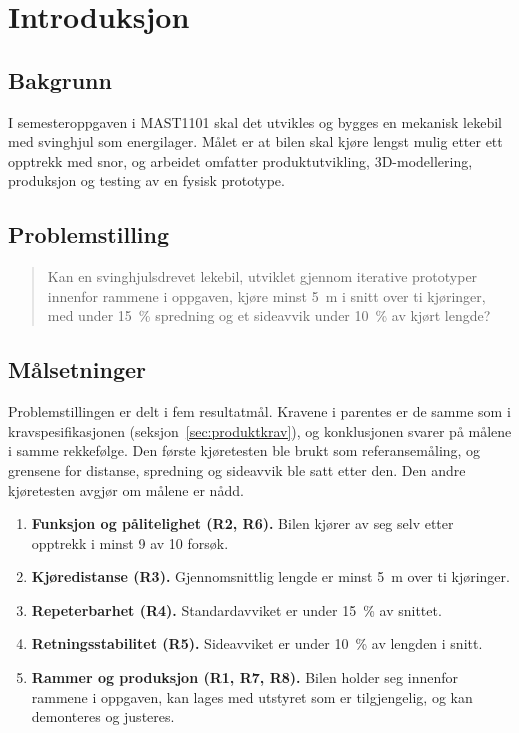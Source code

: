 \section{Introduksjon}
\label{sec:introduksjon}
\subsection{Bakgrunn}
I semesteroppgaven i MAST1101 skal det utvikles og bygges en mekanisk lekebil med svinghjul som energilager. Målet er at bilen skal kjøre lengst mulig etter ett opptrekk med snor, og arbeidet omfatter produktutvikling, 3D-modellering, produksjon og testing av en fysisk prototype.

\subsection{Problemstilling}
\begin{quote}
Kan en svinghjulsdrevet lekebil, utviklet gjennom iterative prototyper innenfor rammene i oppgaven, kjøre minst \SI{5}{m} i snitt over ti kjøringer, med under \SI{15}{\percent} spredning og et sideavvik under \SI{10}{\percent} av kjørt lengde?
\end{quote}

\subsection{Målsetninger}
Problemstillingen er delt i fem resultatmål. Kravene i parentes er de samme som i kravspesifikasjonen (seksjon~\ref{sec:produktkrav}), og konklusjonen svarer på målene i samme rekkefølge. Den første kjøretesten ble brukt som referansemåling, og grensene for distanse, spredning og sideavvik ble satt etter den. Den andre kjøretesten avgjør om målene er nådd.
\begin{enumerate}
    \item \textbf{Funksjon og pålitelighet (R2, R6).} Bilen kjører av seg selv etter opptrekk i minst 9 av 10 forsøk.
    \item \textbf{Kjøredistanse (R3).} Gjennomsnittlig lengde er minst \SI{5}{m} over ti kjøringer.
    \item \textbf{Repeterbarhet (R4).} Standardavviket er under \SI{15}{\percent} av snittet.
    \item \textbf{Retningsstabilitet (R5).} Sideavviket er under \SI{10}{\percent} av lengden i snitt.
    \item \textbf{Rammer og produksjon (R1, R7, R8).} Bilen holder seg innenfor rammene i oppgaven, kan lages med utstyret som er tilgjengelig, og kan demonteres og justeres.
\end{enumerate}

